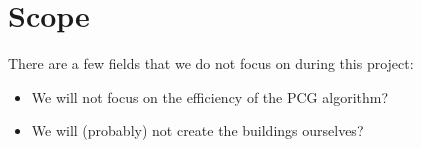 \section{Scope}
There are a few fields that we do not focus on during this project:

\begin{itemize}
  \item We will not focus on the efficiency of the PCG algorithm?
  \item We will (probably) not create the buildings ourselves?
\end{itemize}
